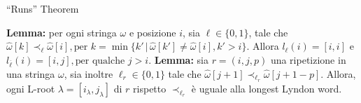 \documentclass{beamer}
\begin{document}
    \begin{frame}{``Runs'' Theorem}

        \textbf{Lemma:} per ogni stringa \(\omega\) e posizione \(i\),
        sia \(\ell \in \{0, 1\} \), tale che \(\hat{\omega}[k] \prec_{\ell} 
        \hat{\omega}[i], \text{per } k = \min \{ k' \, \vert \, \hat{\omega}[k'] \ne 
        \hat{\omega}[i], k' > i\}\). Allora \(l_{\ell}(i) = [i, i]\) e 
        \(l_{\overline{\ell}}(i) = [i, j], \text{per qualche } j > i\).
        \vskip 10pt 
        \textbf{Lemma: } sia \(r = (i, j, p)\) una ripetizione in una stringa
        \(\omega\), sia inoltre \(\ell_{r} \in \{0, 1\}\) tale che 
        \(\hat{\omega}[j + 1] \prec_{\ell_{r}} \hat{\omega}[j + 1 -p]\).
        Allora, ogni L-root \(\lambda = [i_{\lambda}, j_{\lambda}]\) di \(r\)
        rispetto \(\prec_{\ell_{r}}\) è uguale alla longest Lyndon word.
   \end{frame}
 
\end{document}

